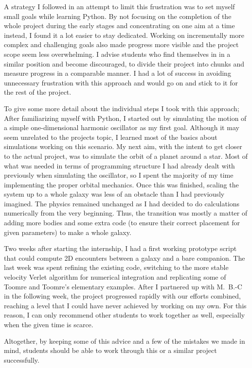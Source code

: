 \documentclass[11pt,twocolumn]{article}
\begin{document}
\begin{appendix}
\begin{strip}
A strategy I followed in an attempt to limit this frustration was to set myself small goals while learning Python. By not focusing on the completion of the whole project during the early stages and concentrating on one aim at a time instead, I found it a lot easier to stay dedicated. Working on incrementally more complex and challenging goals also made progress more visible and the project scope seem less overwhelming. I advise students who find themselves in in a similar position and become discouraged, to divide their project into chunks and measure progress in a comparable manner. I had a lot of success in avoiding unnecessary frustration with this approach and would go on and stick to it for the rest of the project. 

To give some more detail about the individual steps I took with this approach; After familiarizing myself with Python, I started out by simulating the motion of a simple one-dimensional harmonic oscillator as my first goal. Although it may seem unrelated to the projects topic, I learned most of the basics about simulations working on this scenario. My next aim, with the intent to get closer to the actual project, was to simulate the orbit of a planet around a star. Most of what was needed in terms of programming structure I had already dealt with previously when simulating the oscillator, so I spent the majority of my time implementing the proper orbital mechanics. Once this was finished, scaling the system up to a whole galaxy was less of an obstacle than I had previously imagined. The physics remained unchanged as I had decided to do calculations numerically from the very beginning. Thus, the transition was mostly a matter of adding more bodies and some extra code (to ensure their correct placement for given parameters) to make a whole galaxy.

Two weeks after starting the internship, I had a first working prototype script that could compute 2D encounters between a galaxy and a bare companion. The last week was spent refining the existing code, switching to the more stable velocity Verlet algorithm for numerical integration and replicating some of Toomre and Toomre's elementary examples. After I partnered up with M.~B.-C in the following week, the project progressed rapidly with our efforts combined, reaching a level that I could have never achieved by working on my own. For this reason, I can only recommend other students to work together as well, especially when the given time is scarce.

Altogether, by keeping some of this advice and a few of the mistakes we made in mind, students should be able to work through this or a similar project successfully.


\end{strip}


\leavevmode


\end{appendix}
\end{document}
